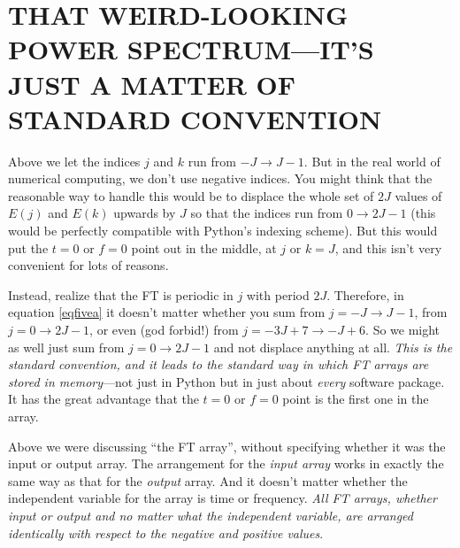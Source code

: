 \documentclass[11pt,preprint]{aastex}
\begin{document}
\section{THAT WEIRD-LOOKING POWER SPECTRUM---IT'S JUST A MATTER OF 
STANDARD CONVENTION}

          Above we let the indices $j$ and $k$ run from $-J \rightarrow
J-1$.  But in the real world of numerical computing, we don't use
negative indices.  You might think that the reasonable way to handle
this would be to displace the whole set of $2J$ values of $E(j)$ and
$E(k)$ upwards by $J$ so that the indices run from $0 \rightarrow 2J-1$
(this would be perfectly compatible with Python's indexing scheme).  But
this would put the $t=0$ or $f=0$ point out in the middle, at $j$ or
$k=J$, and this isn't very convenient for lots of reasons. 

          Instead, realize that the FT is periodic in $j$ with period
$2J$.  Therefore, in equation \ref{eqfivea} it doesn't matter whether you sum from
$j = -J \to J-1$, from $j = 0 \to 2J-1$, or even (god forbid!) from $j =
-3J + 7 \to -J + 6$.  So we might as well just sum from $j = 0 \to 2J-1$
and not displace anything at all.  {\it This is the standard convention,
and it leads to the standard way in which FT arrays are stored in
memory}---not just in Python but in just about {\it every} software
package.  It has the great advantage that the $t=0$ or $f=0$ point is
the first one in the array. 

          Above we were discussing ``the FT array'', without specifying
whether it was the input or output array.  The arrangement for the {\it
input array} works in exactly the same way as that for the {\it output}
array.  And it doesn't matter whether the independent variable for the
array is time or frequency.  {\it All FT arrays, whether input or output
and no matter what the independent variable, are arranged {\it
identically} with respect to the negative and positive values}. 
\end{document}
